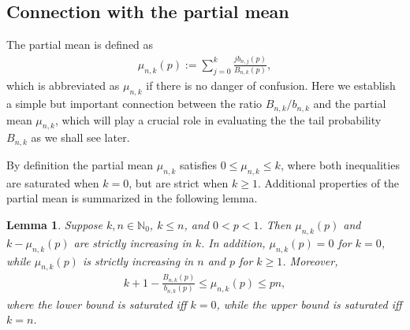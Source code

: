 \documentclass[aop]{imsart}
\theoremstyle{plain}
\newtheorem{lemma}[theorem]{Lemma}
\theoremstyle{remark}
\newcommand{\bbN}{\mathbb{N}}
\newcommand{\1}{\operatorname{\uppercase\expandafter{\romannumeral1}}}
\newcommand{\2}{\operatorname{\uppercase\expandafter{\romannumeral2}}}
\newcommand{\3}{\operatorname{\uppercase\expandafter{\romannumeral3}}}
\newcommand{\4}{\operatorname{\uppercase\expandafter{\romannumeral4}}}
\newcommand{\5}{\operatorname{\uppercase\expandafter{\romannumeral5}}}
\newcommand{\6}{\operatorname{\uppercase\expandafter{\romannumeral6}}}
\newcommand{\7}{\operatorname{\uppercase\expandafter{\romannumeral7}}}
\newcommand{\8}{\operatorname{\uppercase\expandafter{\romannumeral8}}}
\newcommand{\9}{\operatorname{\uppercase\expandafter{\romannumeral9}}}
\begin{document}
\subsection{Connection with the partial mean}
 The partial mean is defined as 
\begin{align}
\mu_{n,k}(p):=\sum_{j=0}^k \frac{j b_{n,j}(p)}{B_{n,k}(p)},  \label{eq:munk}
\end{align}
which is abbreviated as $\mu_{n,k}$ if there is no danger of confusion. Here we establish a simple but important  connection between the ratio $B_{n,k}/b_{n,k}$ and the partial mean $\mu_{n,k}$, which will play a crucial role in evaluating the the tail probability $B_{n,k}$ as we shall see later.



By definition the partial mean  $\mu_{n,k}$ satisfies
$0\leq \mu_{n,k}\leq k$, where both inequalities are saturated when $k=0$, but are strict when $k\geq 1$. Additional properties of the partial mean is summarized in the  following lemma.
\begin{lemma}\label{lem:munk}
	Suppose  $k,n\in \bbN_0$, $k\leq n$, and $0<p<1$. Then $\mu_{n,k}(p)$ and $k-\mu_{n,k}(p)$ are strictly increasing in $k$. In addition,  $\mu_{n,k}(p)=0$  for $k=0$, while   $\mu_{n,k}(p)$ is strictly increasing in $n$ and $p$ for $k\geq 1$. Moreover, 
	\begin{align}
	k+1-\frac{B_{n,k}(p)}{b_{n,k}(p)}\leq \mu_{n,k}(p)\leq pn, \label{eq:munkBnkbnk}
	\end{align}
	where the lower bound is saturated iff $k=0$, while the upper bound is saturated iff $k=n$. 	
\end{lemma}
	
\end{document}
